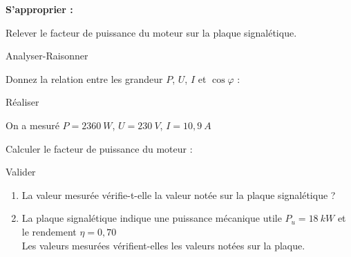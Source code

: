 \documentclass[11pt,a4paper]{article}
\newcommand{\cadreblanc}[1]{%
\medskip\framebox[\linewidth][c]{%
\rule{0mm}{#1mm}}\par
\medskip}
\begin{document}
\vfill 

   \textbf{S'approprier : }

    Relever le facteur de puissance du moteur sur la plaque signalétique. \\ 
    
    \cadreblanc{10}

    \vfill 

     Analyser-Raisonner 

    Donnez la relation entre les grandeur $P$, $U$, $I$ et $\cos \varphi$ : 

    \cadreblanc{10}

    \vfill 

     Réaliser

    On a mesuré $P  = 2 360~W$,  $U=230~V$, $I=10,9~A$
    
    Calculer le facteur de puissance du moteur : 

    \cadreblanc{10}

    \vfill 

     Valider

    \begin{enumerate}
        \item La valeur mesurée vérifie-t-elle la valeur notée sur la plaque signalétique ? \\

    \vspace{3mm} \dotfill 

    \item La plaque signalétique indique une puissance mécanique utile $P_u = 18~kW$ et \\le rendement $\eta=0,70$ \\  
    
    Les valeurs mesurées vérifient-elles les valeurs notées sur la plaque. 

    \cadreblanc{25}
    \end{enumerate}
    
\vfill 
\end{document}
